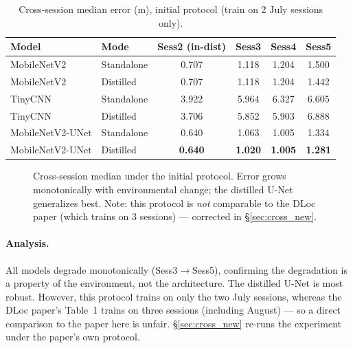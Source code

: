\documentclass[11pt,a4paper]{article}
\newcommand{\best}[1]{\textcolor{ours}{\textbf{#1}}}
\begin{document}
\begin{table}[H]
\centering
\caption{Cross-session median error (m), initial protocol (train on 2 July sessions only).}
\label{tab:cross_old}
\begin{tabular}{@{}llcccc@{}}
\toprule
\textbf{Model} & \textbf{Mode} & \textbf{Sess2 (in-dist)} & \textbf{Sess3} & \textbf{Sess4} & \textbf{Sess5} \\
\midrule
MobileNetV2   & Standalone & 0.707 & 1.118 & 1.204 & 1.500 \\
MobileNetV2   & Distilled  & 0.707 & 1.118 & 1.204 & 1.442 \\
TinyCNN       & Standalone & 3.922 & 5.964 & 6.327 & 6.605 \\
TinyCNN       & Distilled  & 3.706 & 5.852 & 5.903 & 6.888 \\
MobileNetV2-UNet & Standalone & 0.640 & 1.063 & 1.005 & 1.334 \\
MobileNetV2-UNet & Distilled  & \best{0.640} & \best{1.020} & \best{1.005} & \best{1.281} \\
\bottomrule
\end{tabular}
\end{table}

\begin{figure}[H]
\centering
{}
\caption{Cross-session median under the initial protocol. Error grows monotonically with
environmental change; the distilled U-Net generalizes best. Note: this protocol is \emph{not}
comparable to the DLoc paper (which trains on 3 sessions) --- corrected in \S\ref{sec:cross_new}.}
\end{figure}

\paragraph{Analysis.} All models degrade monotonically (Sess3$\to$Sess5), confirming the
degradation is a property of the environment, not the architecture. The distilled U-Net is most
robust. However, this protocol trains on only the two July sessions, whereas the DLoc paper's
Table~1 trains on three sessions (including August) --- so a direct comparison to the paper here
is unfair. \S\ref{sec:cross_new} re-runs the experiment under the paper's own protocol.
\end{document}
